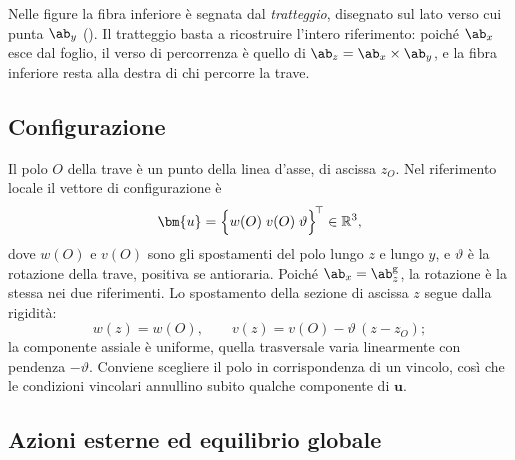 Nelle figure la fibra inferiore è segnata dal
\emph{tratteggio}, disegnato sul lato verso cui punta
$\ab_y$ (). Il
tratteggio basta a ricostruire l'intero riferimento:
poiché $\ab_x$ esce dal foglio, il verso di percorrenza
è quello di $\ab_z = \ab_x \times \ab_y$, e la fibra
inferiore resta alla destra di chi percorre la trave.





\subsection{Configurazione}
\label{sec:polo_trave}

Il polo $O$ della trave è un punto della linea d'asse,
di ascissa $z_O$. Nel riferimento locale il vettore di
configurazione è
\begin{equation}\label{eq:conf_trave}
	\bm{u} =
	\Bigl\{w(O)\; v(O) \; \vartheta\Bigr\}^{\!\top}
	\in \mathbb{R}^3,
\end{equation}
dove $w(O)$ e $v(O)$ sono gli spostamenti del polo lungo
$z$ e lungo $y$, e $\vartheta$ è la rotazione della trave,
positiva se antioraria. Poiché $\ab_x = \ab_z^{\mathrm{g}}$,
la rotazione è la stessa nei due riferimenti. Lo
spostamento della sezione di ascissa $z$ segue dalla
rigidità:
\begin{equation}\label{eq:cinematica_trave}
	w(z) = w(O),
	\qquad
	v(z) = v(O) - \vartheta\,(z - z_O);
\end{equation}
la componente assiale è uniforme, quella trasversale
varia linearmente con pendenza $-\vartheta$. Conviene
scegliere il polo in corrispondenza di un vincolo, così
che le condizioni vincolari annullino subito qualche
componente di $\bm{u}$.



\subsection{Azioni esterne ed equilibrio globale}
\label{sec:azioni_esterne}

